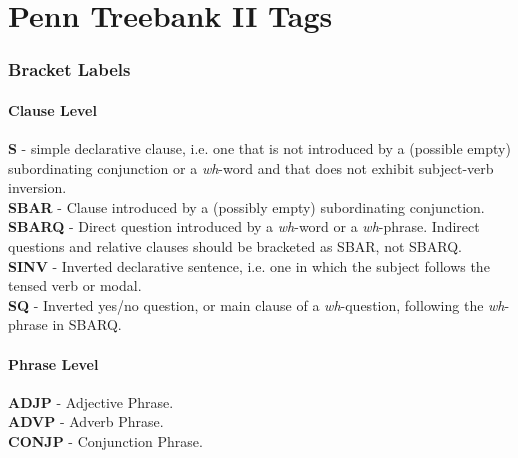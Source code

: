 \chapter{Penn Treebank II Tags\label{sec:penntags}}

\subsection*{Bracket Labels}

\subsubsection*{Clause Level}

\par 

\textbf{S} - simple declarative clause, i.e. one that is not introduced by a
(possible empty) subordinating conjunction or a \textit{wh}-word and that does
not exhibit subject-verb inversion.\\

\textbf{SBAR} - Clause introduced by a (possibly empty) subordinating
conjunction.\\

\textbf{SBARQ} - Direct question introduced by a \textit{wh}-word or
a \textit{wh}-phrase.  Indirect questions and relative clauses should be
bracketed as SBAR, not SBARQ.\\



\textbf{SINV} - Inverted declarative sentence, i.e. one in which the subject follows the tensed verb or modal.\\



\textbf{SQ} - Inverted yes/no question, or main clause of a \textit{wh}-question, following the \textit{wh}-phrase in SBARQ.\\



\subsubsection*{Phrase Level}

\textbf{ADJP} - Adjective Phrase.\\



\textbf{ADVP} - Adverb Phrase.\\



\textbf{CONJP} - Conjunction Phrase.\\



